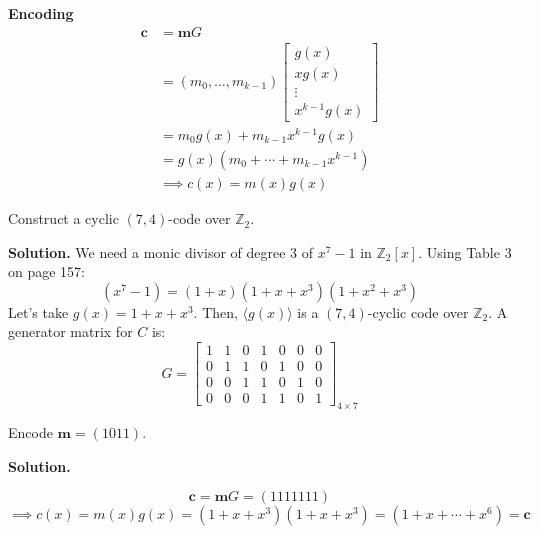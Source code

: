 \textbf{Encoding}
\begin{align*}
    \bm{c}
     & =\bm{m}G                           \\
     & =(m_0,\ldots,m_{k-1})
    \begin{bmatrix}
        g(x)   \\
        xg(x)  \\
        \vdots \\
        x^{k-1}g(x)
    \end{bmatrix}             \\
     & =m_0g(x)+m_{k-1}x^{k-1}g(x)        \\
     & =g(x)(m_0+\cdots + m_{k-1}x^{k-1}) \\
     & \implies c(x)=m(x)g(x)
\end{align*}

\begin{Example}{}{}
    Construct a cyclic $ (7,4) $-code over $ \mathbb{Z}_2 $.

    \textbf{Solution.} We need a monic divisor
    of degree $ 3 $ of $ x^7-1 $ in $ \mathbb{Z}_2[x] $. Using
    Table 3 on page 157:
    \[ (x^7-1)=(1+x)(1+x+x^3)(1+x^2+x^3) \]
    Let's take $ g(x)=1+x+x^3 $. Then, $ \langle g(x)\rangle $ is a
    $ (7,4) $-cyclic code over $ \mathbb{Z}_2 $. A generator matrix
    for $ C $ is:
    \[ G=
        \begin{bmatrix}
            1 & 1 & 0 & 1 & 0 & 0 & 0 \\
            0 & 1 & 1 & 0 & 1 & 0 & 0 \\
            0 & 0 & 1 & 1 & 0 & 1 & 0 \\
            0 & 0 & 0 & 1 & 1 & 0 & 1
        \end{bmatrix}_{4\times 7} \]

    Encode $ \bm{m}=(1011) $.

    \textbf{Solution.}

    \[ \bm{c}=\bm{m}G=(1111111) \]
    \[ \implies c(x)=m(x)g(x)=(1+x+x^3)(1+x+x^3)=(1+x+\cdots+x^6)=\bm{c} \]
\end{Example}

